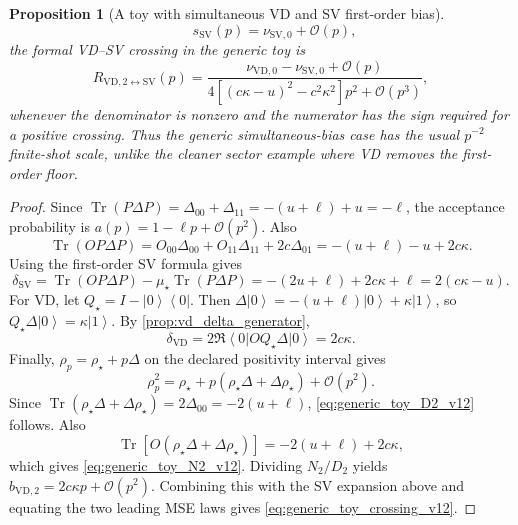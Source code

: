 \documentclass[11pt]{article}
\newtheorem{proposition}{Proposition}
\DeclareMathOperator{\Tr}{Tr}
\newcommand{\1}{\mathbf{1}}
\newcommand{\OO}{\mathcal{O}}
\newcommand{\bra}[1]{\left\langle #1\right|}
\newcommand{\ket}[1]{\left|#1\right\rangle}
\begin{document}
\begin{proposition}[A toy with simultaneous VD and SV first-order bias]
\begin{equation}
    \qquad
    s_{\mathrm{SV}}(p)=\nu_{\mathrm{SV},0}+\OO(p),
\end{equation}
the formal VD--SV crossing in the generic toy is
\begin{equation}
    R_{\mathrm{VD},2\leftrightarrow\mathrm{SV}}(p)
    =
    \frac{\nu_{\mathrm{VD},0}-\nu_{\mathrm{SV},0}+\OO(p)}
    {4[(c\kappa-u)^2-c^2\kappa^2]p^2+\OO(p^3)},
    \label{eq:generic_toy_crossing_v12}
\end{equation}
whenever the denominator is nonzero and the numerator has the sign required for a positive crossing.  Thus the generic simultaneous-bias case has the usual \(p^{-2}\) finite-shot scale, unlike the cleaner sector example where VD removes the first-order floor.
\end{proposition}

\begin{proof}
Since \(\Tr(P\Delta P)=\Delta_{00}+\Delta_{11}=-(u+\ell)+u=-\ell\), the acceptance probability is \(a(p)=1-\ell p+\OO(p^2)\).  Also
\begin{equation}
    \Tr(OP\Delta P)=O_{00}\Delta_{00}+O_{11}\Delta_{11}+2c\Delta_{01}=-(u+\ell)-u+2c\kappa.
\end{equation}
Using the first-order SV formula gives
\begin{equation}
    \delta_{\mathrm{SV}}
    =\Tr(OP\Delta P)-\mu_\star\Tr(P\Delta P)
    =-(2u+\ell)+2c\kappa+\ell
    =2(c\kappa-u).
\end{equation}
For VD, let \(Q_\star=I-\ket0\bra0\).  Then \(\Delta\ket0=-(u+\ell)\ket0+\kappa\ket1\), so \(Q_\star\Delta\ket0=\kappa\ket1\).  By \cref{prop:vd_delta_generator},
\begin{equation}
    \delta_{\mathrm{VD}}
    =2\Re\bra0 OQ_\star\Delta\ket0
    =2c\kappa.
\end{equation}
Finally, \(\rho_p=\rho_\star+p\Delta\) on the declared positivity interval gives
\begin{equation}
    \rho_p^2=\rho_\star+p(\rho_\star\Delta+\Delta\rho_\star)+\OO(p^2).
\end{equation}
Since \(\Tr(\rho_\star\Delta+\Delta\rho_\star)=2\Delta_{00}=-2(u+\ell)\), \cref{eq:generic_toy_D2_v12} follows.  Also
\begin{equation}
    \Tr\!\left[O(\rho_\star\Delta+\Delta\rho_\star)\right]
    =-2(u+\ell)+2c\kappa,
\end{equation}
which gives \cref{eq:generic_toy_N2_v12}.  Dividing \(N_2/D_2\) yields \(b_{\mathrm{VD},2}=2c\kappa p+\OO(p^2)\).  Combining this with the SV expansion above and equating the two leading MSE laws gives \cref{eq:generic_toy_crossing_v12}.
\end{proof}
\end{document}
